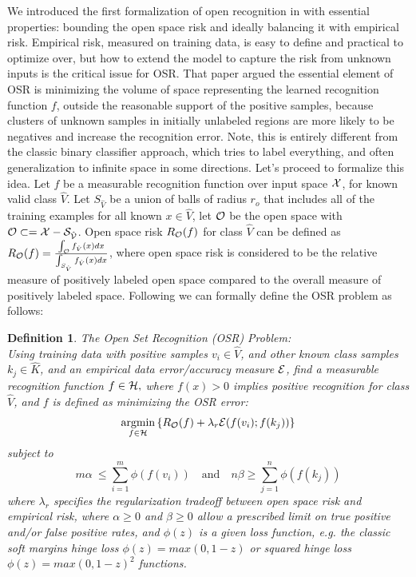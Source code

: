 \documentclass[letterpaper]{article}
\newcommand{\argmin}{\operatornamewithlimits{argmin}}
\newtheorem{mydef}{Definition}
\begin{document}
We introduced the first formalization of open recognition in
 \cite{Walter_openset} with essential properties: bounding the open
space risk and ideally balancing it with empirical risk.
Empirical risk, measured on training data, is easy to define and
practical to optimize over, but how to extend the model to capture the risk from
unknown inputs is the critical issue for OSR.
That paper argued the essential element of OSR is minimizing the volume
of space representing the learned recognition function $f$, outside
the reasonable support of the positive samples, because clusters of
unknown samples in initially unlabeled regions are more likely to be
negatives and increase the recognition error.
Note, this is entirely different from the classic binary classifier
approach, which tries to label everything, and often generalization to
infinite space in some directions.
Let's proceed to formalize this idea.
Let $f$ be a measurable recognition function over input space $\cal
X$, for known valid class ${\hat V}$. Let $S_{\hat V}$ be a union
of balls of radius $r_o$ that includes all of the training examples
for all known $x \in {\hat V}$, let ${\cal O}$ be the open space with
$\cal O \subset= X-S_{\hat V}$.
Open space risk $R_{\cal O}(f)$ for class ${\hat V}$ can be defined as $R_{{\cal O}}(f) = \frac{\int_{{\cal O}} f_{\hat V}(x) dx}{\int_{S_{\hat V}} f_{\hat V}(x) dx} $, where open space risk is considered to be the relative measure of positively labeled open space compared to the overall measure of positively labeled space.
Following  \cite{Walter_openset} we can formally define the OSR problem as follows:
\begin{mydef}
\label{def:openset}
\textup{The Open Set Recognition (OSR) Problem:}\\
Using training data with positive
samples $v_i \in{\hat V}$, and other known class samples  $k_j \in {\hat   K}$, and an empirical data error/accuracy measure $\cal E$, find a measurable recognition function $f\in \cal H, $ where $f(x)>0$ implies positive recognition for class ${\hat V}$, and $f$ is defined as minimizing the OSR error:
{\small
\begin{equation}
\label{eq:openspacerecognition}
\argmin_{f \in {\cal H}} \left\{{ R_{{\cal O}}(f)   + \lambda_r  {\cal E}(f(v_{i}); f(k_{j}))}\right\}
\end{equation}
subject to 
\begin{equation}
m\alpha\ \le \sum\limits_{i=1}^m \phi(f(v_{i}))  \quad  \mathrm{ and } \quad   n\beta \ge \sum\limits_{j=1}^n \label{eq:sampleerror}
\phi(f(k_{j}))
\end{equation}
}where $\lambda_r$ specifies the regularization tradeoff between open space risk and
empirical risk, where $\alpha\ge 0$ and $\beta\ge0$ allow a prescribed limit on
true positive and/or false positive rates, and  $\phi(z)$ is a given loss
function, e.g. the  classic soft margins hinge loss $\phi(z)=max(0,1-z)$ or squared hinge loss $\phi(z)=max(0,1-z)^2$ functions.
\end{mydef}
\end{document}

